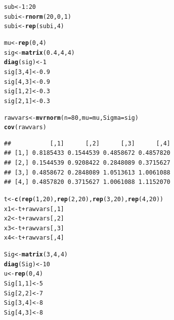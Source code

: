 \documentclass[11pt,a4paper,twoside]{book}\usepackage[]{graphicx}\usepackage[]{color}
\makeatletter
\newcommand{\hlnum}[1]{\textcolor[rgb]{0.686,0.059,0.569}{#1}}%
\newcommand{\hlopt}[1]{\textcolor[rgb]{0,0,0}{#1}}%
\newcommand{\hlstd}[1]{\textcolor[rgb]{0.345,0.345,0.345}{#1}}%
\newcommand{\hlkwb}[1]{\textcolor[rgb]{0.69,0.353,0.396}{#1}}%
\newcommand{\hlkwc}[1]{\textcolor[rgb]{0.333,0.667,0.333}{#1}}%
\newcommand{\hlkwd}[1]{\textcolor[rgb]{0.737,0.353,0.396}{\textbf{#1}}}%
\newenvironment{kframe}{%
 \def\at@end@of@kframe{}%
 \ifinner\ifhmode%
  \def\at@end@of@kframe{\end{minipage}}%
  \begin{minipage}{\columnwidth}%
 \fi\fi%
 \def\FrameCommand##1{\hskip\@totalleftmargin \hskip-\fboxsep
 \colorbox{shadecolor}{##1}\hskip-\fboxsep
     \hskip-\linewidth \hskip-\@totalleftmargin \hskip\columnwidth}%
 \MakeFramed {\advance\hsize-\width
   \@totalleftmargin\z@ \linewidth\hsize
   \@setminipage}}%
 {\par\unskip\endMakeFramed%
 \at@end@of@kframe}
\newenvironment{knitrout}{}{} %
\makeatother
\begin{document}
\begin{knitrout}
\color{fgcolor}\begin{kframe}
\begin{alltt}
\hlstd{sub}\hlkwb{<-} \hlnum{1}\hlopt{:}\hlnum{20}
\hlstd{subi} \hlkwb{<-} \hlkwd{rnorm}\hlstd{(}\hlnum{20}\hlstd{,} \hlnum{0}\hlstd{,} \hlnum{1}\hlstd{)}
\hlstd{subi}\hlkwb{<-}\hlkwd{rep}\hlstd{(subi,} \hlnum{4}\hlstd{)}

\hlstd{mu} \hlkwb{<-} \hlkwd{rep}\hlstd{(}\hlnum{0}\hlstd{,}\hlnum{4}\hlstd{)}
\hlstd{sig} \hlkwb{<-} \hlkwd{matrix}\hlstd{(}\hlnum{0.4}\hlstd{,} \hlnum{4}\hlstd{,} \hlnum{4}\hlstd{)}
\hlkwd{diag}\hlstd{(sig)} \hlkwb{<-} \hlnum{1}
\hlstd{sig[}\hlnum{3}\hlstd{,}\hlnum{4}\hlstd{]} \hlkwb{<-} \hlnum{0.9}
\hlstd{sig[}\hlnum{4}\hlstd{,}\hlnum{3}\hlstd{]} \hlkwb{<-} \hlnum{0.9}
\hlstd{sig[}\hlnum{1}\hlstd{,}\hlnum{2}\hlstd{]} \hlkwb{<-} \hlnum{0.3}
\hlstd{sig[}\hlnum{2}\hlstd{,}\hlnum{1}\hlstd{]} \hlkwb{<-} \hlnum{0.3}

\hlstd{rawvars} \hlkwb{<-} \hlkwd{mvrnorm}\hlstd{(}\hlkwc{n}\hlstd{=}\hlnum{80}\hlstd{,} \hlkwc{mu}\hlstd{=mu,} \hlkwc{Sigma}\hlstd{=sig)}
\hlkwd{cov}\hlstd{(rawvars)}
\end{alltt}
\begin{verbatim}
##           [,1]      [,2]      [,3]      [,4]
## [1,] 0.8185433 0.1544539 0.4858672 0.4857820
## [2,] 0.1544539 0.9208422 0.2848089 0.3715627
## [3,] 0.4858672 0.2848089 1.0513613 1.0061088
## [4,] 0.4857820 0.3715627 1.0061088 1.1152070
\end{verbatim}
\begin{alltt}
\hlstd{t} \hlkwb{<-} \hlkwd{c}\hlstd{(}\hlkwd{rep}\hlstd{(}\hlnum{1}\hlstd{,} \hlnum{20}\hlstd{),}\hlkwd{rep}\hlstd{(}\hlnum{2}\hlstd{,}\hlnum{20}\hlstd{),} \hlkwd{rep}\hlstd{(}\hlnum{3}\hlstd{,} \hlnum{20}\hlstd{),} \hlkwd{rep}\hlstd{(}\hlnum{4}\hlstd{,} \hlnum{20}\hlstd{))}
\hlstd{x1} \hlkwb{<-} \hlstd{t}\hlopt{+}\hlstd{rawvars[,}\hlnum{1}\hlstd{]}
\hlstd{x2} \hlkwb{<-} \hlstd{t}\hlopt{+}\hlstd{rawvars[,}\hlnum{2}\hlstd{]}
\hlstd{x3} \hlkwb{<-} \hlstd{t}\hlopt{+}\hlstd{rawvars[,}\hlnum{3}\hlstd{]}
\hlstd{x4} \hlkwb{<-} \hlstd{t}\hlopt{+}\hlstd{rawvars[,}\hlnum{4}\hlstd{]}

\hlstd{Sig}\hlkwb{<-} \hlkwd{matrix}\hlstd{(}\hlnum{3}\hlstd{,} \hlnum{4}\hlstd{,}\hlnum{4}\hlstd{)}
\hlkwd{diag}\hlstd{(Sig)} \hlkwb{<-} \hlnum{10}
\hlstd{u} \hlkwb{<-} \hlkwd{rep}\hlstd{(}\hlnum{0}\hlstd{,} \hlnum{4}\hlstd{)}
\hlstd{Sig[}\hlnum{1}\hlstd{,}\hlnum{1}\hlstd{]} \hlkwb{<-} \hlnum{5}
\hlstd{Sig[}\hlnum{2}\hlstd{,}\hlnum{2}\hlstd{]} \hlkwb{<-} \hlnum{7}
\hlstd{Sig[}\hlnum{3}\hlstd{,}\hlnum{4}\hlstd{]} \hlkwb{<-} \hlnum{8}
\hlstd{Sig[}\hlnum{4}\hlstd{,}\hlnum{3}\hlstd{]} \hlkwb{<-} \hlnum{8}


\end{alltt}
\end{kframe}
\end{knitrout}
\end{document}
